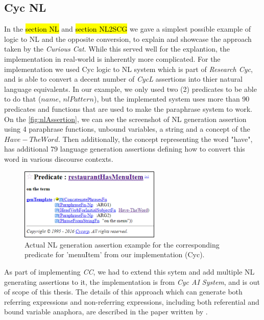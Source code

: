\subsection{Cyc NL}
\label{section:cycnl}
In the \hl{section NL} and \hl{section NL2SCG} we gave a simplest possible 
example of logic to NL and the opposite conversion, to explain and showcase the
approach taken by the \emph{Curious Cat}. While this served well for the
explantion, the implementation in real-world is inherently more complicated.
For the implementation we used Cyc logic to NL system which is part of 
\emph{Research Cyc}\autocite{Coppock2010,Baxter2005}, and is able to convert
a decent number of \emph{CycL} assertions into thier natural language 
equivalents. In our example, we only used two (2) predicates to be able to
do that ($name$, $nlPattern$), but the implemented system uses more than
90 predicates and functions that are used to make the paraphrase system to work.
On the \autoref{fig:nlAssertion}, we can see the screenshot of
NL generation assertion using 4 paraphrase functions, unbound variables,
a string and a concept of the $Have-TheWord$. Then additionally, the concept
representing the word "have", has additional 79 language generation assertions
defining how to convert this word in various discourse contexts. 

\begin{figure}[h]
	\centering
		\includegraphics[width=0.6\textwidth]{figures/nlAssertion.png}
	\caption{Actual NL generation assertion example for the corresponding predicate for 'menuItem' from our implementation (Cyc).}
	\label{fig:nlAssertion}
\end{figure}

As part of implementing \emph{CC}, we had
to extend this sytem and add multiple NL generating assertions to it, the
implementation is from \emph{Cyc AI System}, and is out of scope of this 
thesis. The details of this approach which can generate both referring 
expressions and non-referring expressions, including both referential and 
bound variable anaphora, are described in the paper written by
\textcite{Coppock2010}. 

